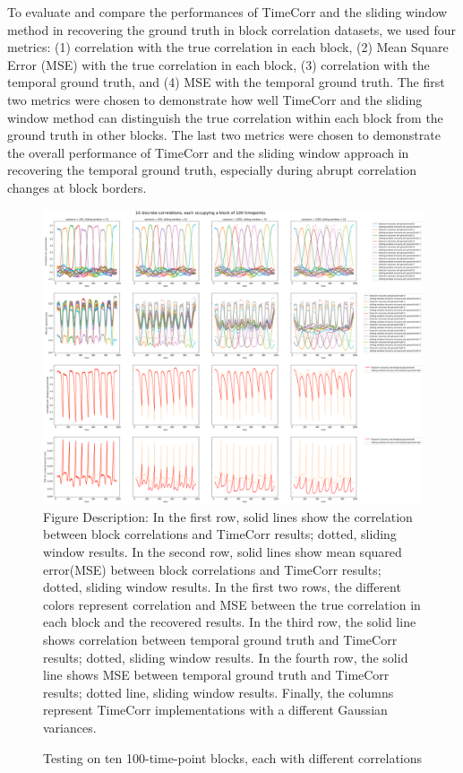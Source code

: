 \documentclass[11pt]{article}
\begin{document}
To evaluate and compare the performances of TimeCorr and the sliding window method in recovering the ground truth in block correlation datasets, we used four metrics: (1) correlation with the true correlation in each block, (2) Mean Square Error (MSE) with the true correlation in each block, (3) correlation with the temporal ground truth, and (4) MSE with the temporal ground truth. The first two metrics were chosen to demonstrate how well TimeCorr and the sliding window method can distinguish the true correlation within each block from the ground truth in other blocks. The last two metrics were chosen to demonstrate the overall performance of TimeCorr and the sliding window approach in recovering the temporal ground truth, especially during abrupt correlation changes at block borders.

\begin{figure}[!htb]
\caption{Testing on ten 100-time-point blocks, each with different correlations}
\includegraphics[width=1\textwidth]{../figures/SyntheticTesting/10block100t.png}
\label{fig:10block100t}
Figure Description: In the first row, solid lines show the correlation between block correlations and TimeCorr results; dotted, sliding window results. In the second row, solid lines show mean squared error(MSE) between block correlations and TimeCorr results; dotted, sliding window results. In the first two rows, the different colors represent correlation and MSE between the true correlation in each block and the recovered results. In the third row, the solid line shows correlation between temporal ground truth and TimeCorr results; dotted, sliding window results. In the fourth row, the solid line shows MSE between temporal ground truth and TimeCorr results; dotted line, sliding window results. Finally, the columns represent TimeCorr implementations with a different Gaussian variances.
\end{figure}
\end{document}
